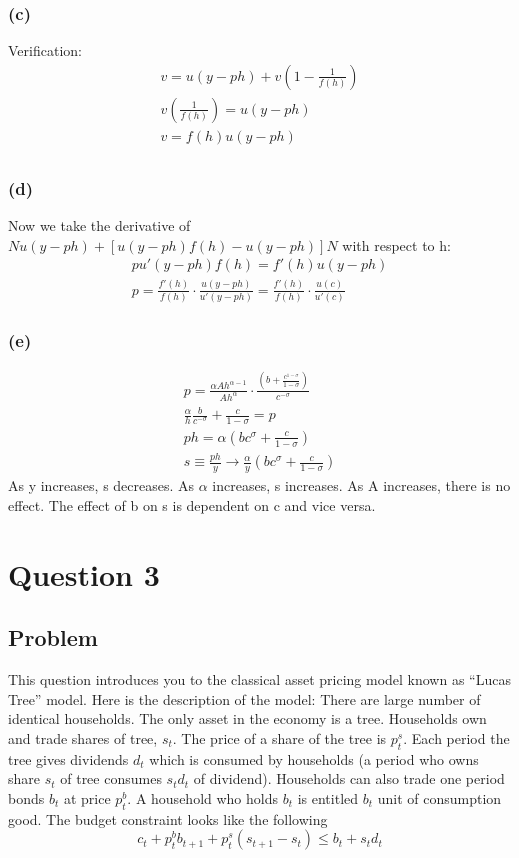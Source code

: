 \documentclass[10pt, a4paper]{article}
\begin{document}
    \subsubsection*{(c)}
      Verification:
      \begin{gather*}
        v = u(y-ph) + v(1-\frac{1}{f(h)}) \\
        v(\frac{1}{f(h)}) = u(y-ph) \\
        v = f(h)u(y-ph) \\
      \end{gather*}
    \subsubsection*{(d)}
      Now we take the derivative of $Nu(y-ph)+[u(y-ph)f(h)-u(y-ph)]N$ with respect to h:
      \begin{gather*}
        pu'(y-ph)f(h) = f'(h)u(y-ph) \\
        p = \frac{f'(h)}{f(h)}\cdot\frac{u(y-ph)}{u'(y-ph)} = \frac{f'(h)}{f(h)}\cdot\frac{u(c)}{u'(c)}
      \end{gather*}
    \subsubsection*{(e)}
      \begin{gather*}
        p = \frac{\alpha Ah^{\alpha-1}}{Ah^{\alpha}}\cdot\frac{(b+\frac{c^{1-\sigma}}{1-\sigma})}{c^{-\sigma}} \\
        \frac{\alpha}{h}\frac{b}{c^{-\sigma}} +\frac{c}{1-\sigma}=p\\
        ph=\alpha(bc^{\sigma}+\frac{c}{1-\sigma}) \\
        s \equiv \frac{ph}{y} \rightarrow \frac{\alpha}{y}(bc^{\sigma}+\frac{c}{1-\sigma})
      \end{gather*}
      As y increases, s decreases. As $\alpha$ increases, s increases. As A increases, there is no effect. The effect of b on s is dependent on c and vice versa.
\section*{Question 3}
  \subsection*{Problem}
    This question introduces you to the classical asset pricing model known as ``Lucas Tree'' model. Here is the description of the model: There are large number of identical households. The only asset in the economy is a tree. Households own and trade shares of tree, $s_t$. The price of a share of the tree is $p_t^s$. Each period the tree gives dividends $d_t$ which is consumed by households (a period who owns share $s_t$ of tree consumes $s_td_t$ of dividend). Households can also trade one period bonds $b_t$ at price $p_t^b$. A household who holds $b_t$ is entitled $b_t$ unit of consumption good. The budget constraint looks like the following
    \[c_t + p_t^b b_{t+1} + p_t^s(s_{t+1} - s_t) \leq b_t + s_td_t\]
\end{document}
